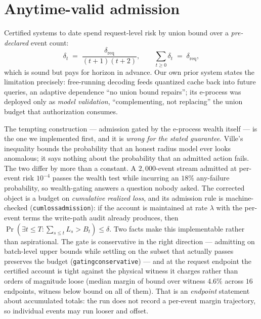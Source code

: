 \documentclass[11pt]{article}
\renewcommand{\_}{\WCorigunderscore\allowbreak}
\begin{document}
\section{Anytime-valid admission}
\label{sec:av}
Certified systems to date spend request-level risk by union bound
over a \emph{pre-declared} event count:
\begin{equation}
\delta_t \;=\; \frac{\delta_{\mathrm{req}}}{(t+1)(t+2)},
\qquad
\sum_{t\ge 0}\delta_t \;=\; \delta_{\mathrm{req}} ,
\label{eq:unionbudget}
\end{equation}
which is sound but pays for horizon in advance. Our own prior system
states the limitation precisely: free-running decoding feeds quantized
cache back into future queries, an adaptive dependence ``no union bound
repairs''; its e-process was deployed only as \emph{model validation},
``complementing, not replacing'' the union budget that authorization
consumes.

The tempting construction --- admission gated by the e-process wealth
itself --- is the one we implemented first, and it is \emph{wrong for
the stated guarantee}. Ville's inequality bounds the probability that an
honest radius model ever looks anomalous; it says nothing about the
probability that an admitted action fails. The two differ by more than a
constant. A $2{,}000$-event stream admitted at per-event risk $10^{-4}$
passes the wealth test while incurring an $18\%$ any-failure
probability, so wealth-gating answers a question nobody asked. The
corrected object is a budget on \emph{cumulative realized loss}, and its
admission rule is machine-checked (\texttt{cumloss\_admission}): if the
account is maintained at rate $\lambda$ with the per-event terms the
write-path audit already produces, then
$\Pr(\exists t\le T:\sum_{s\le t}L_s>B_t)\le\delta$. Two facts make this
implementable rather than aspirational. The gate is conservative in the
right direction --- admitting on batch-level upper bounds while settling
on the subset that actually passes preserves the budget
(\texttt{gating\_conservative}) --- and at the request endpoint the certified
account is tight against the physical witness it charges rather than
orders of magnitude loose (median margin of bound over witness $4.6\%$
across $16$ endpoints, witness below bound on all of them). That is an
\emph{endpoint} statement about accumulated totals: the run does not
record a per-event margin trajectory, so individual events may run
looser and offset.
\end{document}
